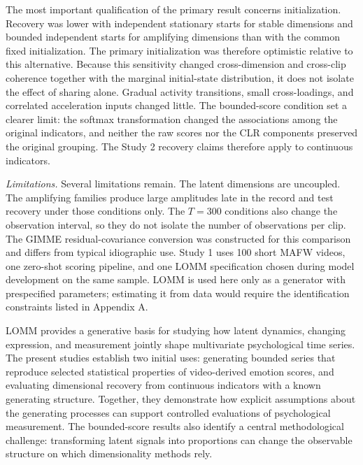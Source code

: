 \documentclass[
]{article}
\begin{document}
The most important qualification of the primary result concerns
initialization. Recovery was lower with independent stationary starts
for stable dimensions and bounded independent starts for amplifying
dimensions than with the common fixed initialization. The primary
initialization was therefore optimistic relative to this alternative.
Because this sensitivity changed cross-dimension and cross-clip
coherence together with the marginal initial-state distribution, it does
not isolate the effect of sharing alone. Gradual activity transitions,
small cross-loadings, and correlated acceleration inputs changed little.
The bounded-score condition set a clearer limit: the softmax
transformation changed the associations among the original indicators,
and neither the raw scores nor the CLR components preserved the original
grouping. The Study 2 recovery claims therefore apply to continuous
indicators.

\emph{Limitations.} Several limitations remain. The latent dimensions
are uncoupled. The amplifying families produce large amplitudes late in
the record and test recovery under those conditions only. The \(T=300\)
conditions also change the observation interval, so they do not isolate
the number of observations per clip. The GIMME residual-covariance
conversion was constructed for this comparison and differs from typical
idiographic use. Study 1 uses 100 short MAFW videos, one zero-shot
scoring pipeline, and one LOMM specification chosen during model
development on the same sample. LOMM is used here only as a generator
with prespecified parameters; estimating it from data would require the
identification constraints listed in Appendix A.

LOMM provides a generative basis for studying how latent dynamics,
changing expression, and measurement jointly shape multivariate
psychological time series. The present studies establish two initial
uses: generating bounded series that reproduce selected statistical
properties of video-derived emotion scores, and evaluating dimensional
recovery from continuous indicators with a known generating structure.
Together, they demonstrate how explicit assumptions about the generating
processes can support controlled evaluations of psychological
measurement. The bounded-score results also identify a central
methodological challenge: transforming latent signals into proportions
can change the observable structure on which dimensionality methods
rely.
\end{document}
